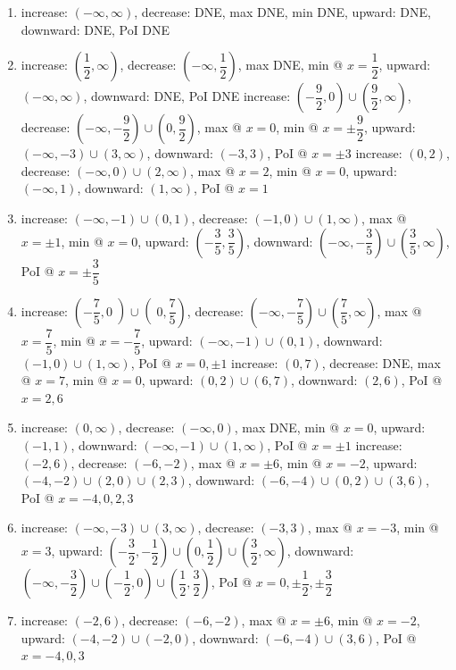 \documentclass{book}
\begin{document}
\begin{appendices}
\begin{enumerate}[!HW!]
\item increase: $(-\infty,\infty)$, decrease: DNE, max  DNE, min  DNE, upward: DNE, downward: DNE, PoI  DNE
\item increase: $\left(\dfrac{1}{2},\infty\right)$, decrease: $\left(-\infty, \dfrac{1}{2}\right)$, max  DNE, min @ $x=\dfrac{1}{2}$, upward: $(-\infty,\infty)$, downward: DNE, PoI DNE
\itemspade  increase: $\left(-\dfrac{9}{2},0\right)\cup\left(\dfrac{9}{2},\infty\right)$, decrease: \mbox{$\left(-\infty,-\dfrac{9}{2}\right)\cup\left(0,\dfrac{9}{2}\right)$,} max @ $x=0$, min @ $x=\pm\dfrac{9}{2}$, upward: $(-\infty,-3)\cup (3,\infty)$, downward: $(-3,3)$, PoI @ $x=\pm3$
\itemspade  increase: $(0,2)$, decrease: $(-\infty,0)\cup(2,\infty)$, max @ $x=2$, min @ $x=0$, upward: $(-\infty,1)$, downward: $(1,\infty)$, PoI @ $x=1$
\item  increase: $(-\infty,-1)\cup(0,1)$, decrease: $(-1,0)\cup(1,\infty)$, max @ $x=\pm1$, min @ $x=0$, upward: $\left(-\dfrac{3}{5},\dfrac{3}{5}\right)$, downward: \mbox{$\left(-\infty,-\dfrac{3}{5}\right)\cup\left(\dfrac{3}{5},\infty\right)$,} PoI @ $x=\pm\dfrac{3}{5}$
\item  increase: $\left(-\dfrac{7}{5},0\middle)\cup\middle(0,\dfrac{7}{5}\right)$, decrease: \mbox{$\left(-\infty,-\dfrac{7}{5}\right)\cup\left(\dfrac{7}{5},\infty\right)$,} max @ $x=\dfrac{7}{5}$, min @ $x=-\dfrac{7}{5}$, upward: $(-\infty,-1)\cup (0,1)$, downward: $(-1,0)\cup (1,\infty)$, PoI @ $x=0, \pm1$
\itemspade  increase: $(0,7)$, decrease: DNE, max @ $x=7$, min @ $x=0$, upward: $(0,2)\cup (6,7)$, downward: $(2,6)$, PoI @ $x=2,6$
\item  increase: $(0, \infty)$, decrease: $(-\infty,0)$, max  DNE, min @ $x=0$, upward: $(-1,1)$, downward: $(-\infty,-1)\cup(1,\infty)$, PoI @ $x=\pm1$
\itemspade  increase: $(-2,6)$, decrease: $(-6,-2)$, max @ $x=\pm6$, min @ $x=-2$, upward: $(-4,-2)\cup (2,0)\cup(2,3)$, downward: $(-6,-4)\cup(0,2)\cup(3,6)$, PoI @ $x=-4,0,2,3$
\item  increase: $(-\infty,-3)\cup(3,\infty)$, decrease: $(-3,3)$, max @ $x=-3$, min @ $x=3$, upward: $\left(-\dfrac{3}{2}, -\dfrac{1}{2}\right)\cup \left(0,\dfrac{1}{2}\right)\cup \left(\dfrac{3}{2},\infty\right)$, downward: $\left(-\infty,-\dfrac{3}{2}\right)\cup \left(-\dfrac{1}{2},0\right)\cup\left(\dfrac{1}{2},\dfrac{3}{2}\right)$, PoI @ $x=0, \pm\dfrac{1}{2}, \pm\dfrac{3}{2}$
\item  increase: $(-2,6)$, decrease: $(-6,-2)$, max @ $x=\pm6$, min @ $x=-2$, upward: $(-4,-2)\cup (-2,0)$, downward: $(-6,-4)\cup(3,6)$, PoI @ $x=-4,0,3$

\end{enumerate}
\end{appendices}
\end{document}
